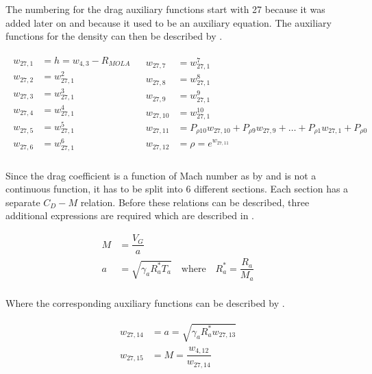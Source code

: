 The numbering for the drag auxiliary functions start with 27 because it was added later on and because it used to be an auxiliary equation. The auxiliary functions for the density can then be described by .

\begin{align} \label{eq:dragAuxF}
\begin{split}
w_{27,1} &= h = w_{4,3} - R_{MOLA} \\
w_{27,2} &= w_{27,1}^{2}\\
w_{27,3} &= w_{27,1}^{3}\\
w_{27,4} &= w_{27,1}^{4}\\
w_{27,5} &= w_{27,1}^{5}\\
w_{27,6} &= w_{27,1}^{6}\\
\end{split}
&
\begin{split}
w_{27,7} &= w_{27,1}^{7}\\
w_{27,8} &= w_{27,1}^{8}\\
w_{27,9} &= w_{27,1}^{9}\\
w_{27,10} &= w_{27,1}^{10}\\
w_{27,11} &= P_{\rho 10}w_{27,10}+P_{\rho 9}w_{27,9}+\dotsc +P_{\rho 1}w_{27,1}+P_{\rho 0}\\
w_{27,12} &= \rho = e^{w_{27,11}} \\
\end{split}
\end{align}

Since the drag coefficient is a function of Mach number as by  and is not a continuous function, it has to be split into 6 different sections. Each section has a separate $C_{D}-M$ relation. Before these relations can be described, three additional expressions are required which are described in .

 \begin{equation} \label{eq:cd}
\begin{split}
M &= \dfrac{V_{G}}{a} \\
a &= \sqrt{\gamma_{a}R_{a}^{*}T_{a}} \quad \text{where} \quad R_{a}^{*}=\dfrac{R_{a}}{M_{a}} \\
\end{split}
\end{equation}

Where the corresponding auxiliary functions can be described by .

\begin{align} \label{eq:cdAuxF}
\begin{split}
w_{27,14} &= a = \sqrt{\gamma_{a}R_{a}^{*}w_{27,13}}  \\
w_{27,15} &= M = \dfrac{w_{4,12}}{w_{27,14}} \\
\end{split}
\end{align}


